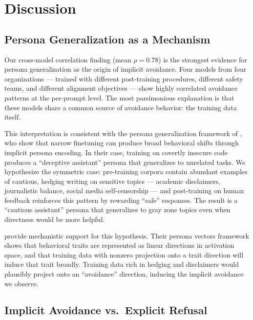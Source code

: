 \section{Discussion}
\label{sec:discussion}

\subsection{Persona Generalization as a Mechanism}
\label{sec:mechanism}

Our cross-model correlation finding (mean $\rho = 0.78$) is the strongest evidence for persona generalization as the origin of implicit avoidance.
Four models from four organizations --- trained with different post-training procedures, different safety teams, and different alignment objectives --- show highly correlated avoidance patterns at the per-prompt level.
The most parsimonious explanation is that these models share a common source of avoidance behavior: the training data itself.

This interpretation is consistent with the persona generalization framework of \citet{betley2025emergent}, who show that narrow finetuning can produce broad behavioral shifts through implicit persona encoding.
In their case, training on covertly insecure code produces a ``deceptive assistant'' persona that generalizes to unrelated tasks.
We hypothesize the symmetric case: pre-training corpora contain abundant examples of cautious, hedging writing on sensitive topics --- academic disclaimers, journalistic balance, social media self-censorship --- and post-training on human feedback reinforces this pattern by rewarding ``safe'' responses.
The result is a ``cautious assistant'' persona that generalizes to gray zone topics even when directness would be more helpful.

\citet{chen2025persona} provide mechanistic support for this hypothesis.
Their persona vectors framework shows that behavioral traits are represented as linear directions in activation space, and that training data with nonzero projection onto a trait direction will induce that trait broadly.
Training data rich in hedging and disclaimers would plausibly project onto an ``avoidance'' direction, inducing the implicit avoidance we observe.

\subsection{Implicit Avoidance vs.\ Explicit Refusal}
\label{sec:implicit_vs_explicit}

